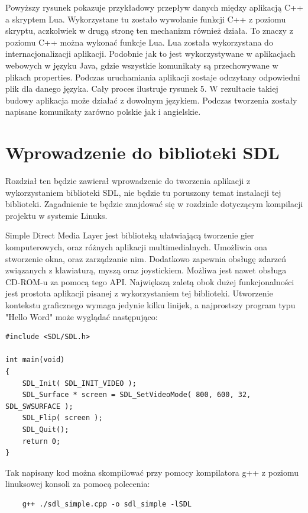 Powyższy rysunek pokazuje przykładowy przepływ danych między aplikacją C++ a skryptem Lua. Wykorzystane tu zostało wywołanie funkcji C++ z poziomu skryptu, aczkolwiek w drugą stronę ten mechanizm również działa. To znaczy z poziomu C++ można wykonać funkcje Lua. Lua została wykorzystana do internacjonalizacji aplikacji. Podobnie jak to jest wykorzystywane w aplikacjach webowych w języku Java, gdzie wszystkie komunikaty są przechowywane w plikach properties. Podczas uruchamiania aplikacji zostaje odczytany odpowiedni plik dla danego języka. Cały proces ilustruje rysunek 5. W rezultacie takiej budowy aplikacja może działać z dowolnym językiem. Podczas tworzenia zostały napisane komunikaty zarówno polskie jak i angielskie.


\section{Wprowadzenie do biblioteki SDL}
Rozdział ten będzie zawierał wprowadzenie do tworzenia aplikacji z wykorzystaniem biblioteki SDL, nie będzie tu poruszony temat instalacji tej biblioteki. Zagadnienie te będzie znajdować się w rozdziale dotyczącym kompilacji projektu w systemie Linuks. 

Simple Direct Media Layer jest biblioteką ułatwiającą tworzenie gier komputerowych, oraz różnych aplikacji multimedialnych. Umożliwia ona stworzenie okna, oraz zarządzanie nim. Dodatkowo zapewnia obsługę zdarzeń związanych z klawiaturą, myszą oraz joystickiem. Możliwa jest nawet obsługa CD-ROM-u za pomocą tego API. Największą zaletą obok dużej funkcjonalności jest prostota aplikacji pisanej z wykorzystaniem tej biblioteki. Utworzenie kontekstu graficznego wymaga jedynie kilku linijek, a najprostszy program typu "Hello Word" może wyglądać następująco:

\begingroup
\fontsize{10pt}{12pt}\selectfont
\begin{verbatim} 
#include <SDL/SDL.h>

int main(void)
{
    SDL_Init( SDL_INIT_VIDEO );
    SDL_Surface * screen = SDL_SetVideoMode( 800, 600, 32, SDL_SWSURFACE );
    SDL_Flip( screen );
    SDL_Quit();
    return 0;
}
\end{verbatim}
\endgroup
Tak napisany kod można skompilować przy pomocy kompilatora g++ z poziomu linuksowej konsoli za pomocą polecenia:
\begin{verbatim} 
	g++ ./sdl_simple.cpp -o sdl_simple -lSDL
\end{verbatim}

